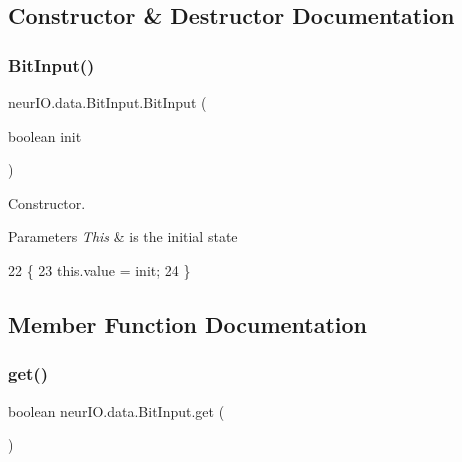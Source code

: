 \subsection{Constructor \& Destructor Documentation}
\mbox{\label{classneur_i_o_1_1data_1_1_bit_input_a8fd7c6ec8c91cac107c49d3a249b9881}} 
\subsubsection{\texorpdfstring{Bit\+Input()}{BitInput()}}
{\footnotesize\ttfamily neur\+I\+O.\+data.\+Bit\+Input.\+Bit\+Input (\begin{DoxyParamCaption}\item[{boolean}]{init }\end{DoxyParamCaption})}

Constructor.


\begin{DoxyParams}{Parameters}
{\em This} & is the initial state \\
\hline
\end{DoxyParams}

\begin{DoxyCode}
22                                  \{
23         this.value = init;
24     \}
\end{DoxyCode}


\subsection{Member Function Documentation}
\mbox{\label{classneur_i_o_1_1data_1_1_bit_input_a408162646fafda86ba4736c7ccc13458}} 
\subsubsection{\texorpdfstring{get()}{get()}}
{\footnotesize\ttfamily boolean neur\+I\+O.\+data.\+Bit\+Input.\+get (\begin{DoxyParamCaption}{ }\end{DoxyParamCaption})}

